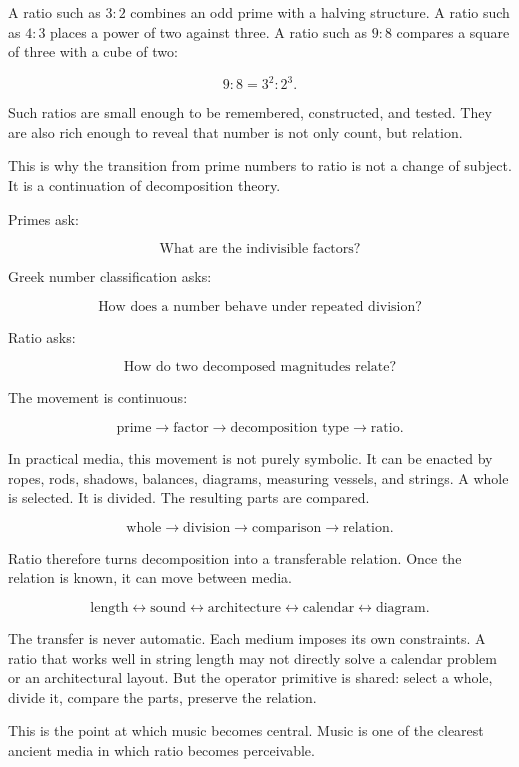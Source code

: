 \documentclass[11pt]{book}
\begin{document}
A ratio such as \(3:2\) combines an odd prime with a halving structure. A ratio such as \(4:3\) places a power of two against three. A ratio such as \(9:8\) compares a square of three with a cube of two:

\[
9:8 = 3^2 : 2^3.
\]

Such ratios are small enough to be remembered, constructed, and tested. They are also rich enough to reveal that number is not only count, but relation.

This is why the transition from prime numbers to ratio is not a change of subject. It is a continuation of decomposition theory.

Primes ask:

\[
\text{What are the indivisible factors?}
\]

Greek number classification asks:

\[
\text{How does a number behave under repeated division?}
\]

Ratio asks:

\[
\text{How do two decomposed magnitudes relate?}
\]

The movement is continuous:

\[
\text{prime}
\rightarrow
\text{factor}
\rightarrow
\text{decomposition type}
\rightarrow
\text{ratio}.
\]

In practical media, this movement is not purely symbolic. It can be enacted by ropes, rods, shadows, balances, diagrams, measuring vessels, and strings. A whole is selected. It is divided.  The resulting parts are compared.

\[
\text{whole}
\rightarrow
\text{division}
\rightarrow
\text{comparison}
\rightarrow
\text{relation}.
\]

Ratio therefore turns decomposition into a transferable relation. Once the relation is known, it can move between media.

\[
\text{length}
\leftrightarrow
\text{sound}
\leftrightarrow
\text{architecture}
\leftrightarrow
\text{calendar}
\leftrightarrow
\text{diagram}.
\]

The transfer is never automatic. Each medium imposes its own constraints. A ratio that works well in string length may not directly solve a calendar problem or an architectural layout. But the operator primitive is shared: select a whole, divide it, compare the parts, preserve the relation.

This is the point at which music becomes central. Music is one of the clearest ancient media in which ratio becomes perceivable.
\end{document}
